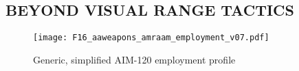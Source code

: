 \marginfigrestore

\subsection[BVR TACTICS]{BEYOND VISUAL RANGE TACTICS}
\label{subsec:bvr}
\begin{figure}[h]
    \centering
    \texttt{[image: F16\_aaweapons\_amraam\_employment\_v07.pdf]}
    \caption{Generic, simplified AIM-120 employment profile}
    \label{fig:aaweap:aim120:profile}
\end{figure}

